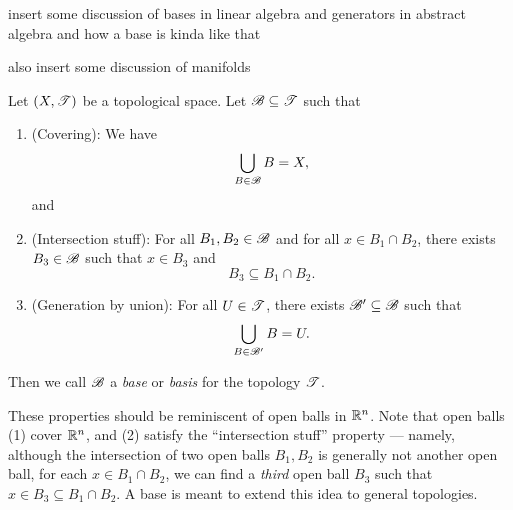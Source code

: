\documentclass{fkpaper}
\begin{document}
\begin{multicols}{2}
  {\color{blue} insert some discussion of bases in linear algebra and
    generators in abstract algebra and how a base is kinda like that}

  {\color{blue} also insert some discussion of manifolds}


  \begin{definition}[Base]\label{def:base}
    Let $(X, {\mathscr{T}})$ be a topological space. Let ${\mathscr{B}} \subseteq {\mathscr{T}}$ such that
    \begin{enumerate}
      \item (Covering): We have
        \[
        \bigcup_{B \in {\mathscr{B}}} B = X,
        \]
        and
      \item (Intersection stuff): For all $B_1, B_2 \in {\mathscr{B}}$ and
        for all $x \in B_1 \cap B_2$, there exists $B_3 \in {\mathscr{B}}$
        such that $x \in B_3$ and
        \[
        B_3 \subseteq B_1 \cap B_2.
        \]
      \item (Generation by union): For all $U \in {\mathscr{T}}$, there exists
        ${\mathscr{B}}' \subseteq {\mathscr{B}}$ such that
        \[
        \bigcup_{B \in {\mathscr{B}}'} B = U.
        \]
    \end{enumerate}
    Then we call ${\mathscr{B}}$ a \emph{base} or \emph{basis} for the
    topology ${\mathscr{T}}$.
  \end{definition}
  These properties should be reminiscent of open balls in $\mathbb{R}^n$.
  Note that open balls (1) cover $\mathbb{R}^n$, and (2) satisfy the
  ``intersection stuff'' property --- namely, although the
  intersection of two open balls $B_1, B_2$ is generally not another
  open ball, for each $x \in B_1 \cap B_2$, we can find a \emph{third}
  open ball $B_3$ such that $x \in B_3 \subseteq B_1 \cap B_2$. A base
  is meant to extend this idea to general topologies.


\end{multicols}




\nocite{*}
\end{document}
